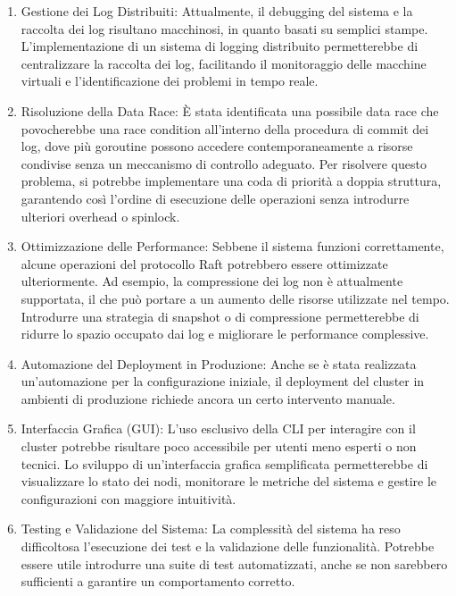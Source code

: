 \begin{enumerate}
  \item Gestione dei Log Distribuiti: Attualmente, il debugging del sistema e la raccolta dei 
  log risultano macchinosi, in quanto basati su semplici stampe. L’implementazione di un sistema 
  di logging distribuito permetterebbe di centralizzare la raccolta dei log, facilitando il 
  monitoraggio delle macchine virtuali e l’identificazione dei problemi in tempo reale. 
  
  \item Risoluzione della Data Race: È stata identificata una possibile data race che povocherebbe 
  una race condition all'interno della procedura di commit dei log, dove più goroutine possono accedere 
  contemporaneamente a risorse condivise senza un meccanismo di controllo adeguato. Per 
  risolvere questo problema, si potrebbe implementare una coda di priorità a doppia struttura,
  garantendo così l'ordine di esecuzione delle operazioni senza 
  introdurre ulteriori overhead o spinlock.

  \item Ottimizzazione delle Performance: Sebbene il sistema funzioni correttamente, 
  alcune operazioni del protocollo Raft potrebbero essere ottimizzate ulteriormente. 
  Ad esempio, la compressione dei log non è attualmente supportata, il che può portare 
  a un aumento delle risorse utilizzate nel tempo. Introdurre una strategia di snapshot
  o di compressione permetterebbe di ridurre lo spazio occupato dai log e migliorare 
  le performance complessive.

  \item Automazione del Deployment in Produzione: Anche se è stata realizzata 
  un’automazione per la configurazione iniziale, il deployment del cluster in ambienti 
  di produzione richiede ancora un certo intervento manuale. 

  \item Interfaccia Grafica (GUI): L'uso esclusivo della CLI per interagire con il 
  cluster potrebbe risultare poco accessibile per utenti meno esperti o non tecnici. 
  Lo sviluppo di un’interfaccia grafica semplificata permetterebbe di visualizzare lo stato 
  dei nodi, monitorare le metriche del sistema e gestire le configurazioni con maggiore intuitività.

  \item Testing e Validazione del Sistema: La complessità del sistema ha reso difficoltosa 
  l’esecuzione dei test e la validazione delle funzionalità. Potrebbe essere utile introdurre 
  una suite di test automatizzati, anche se non sarebbero sufficienti a garantire un 
  comportamento corretto.
\end{enumerate}
